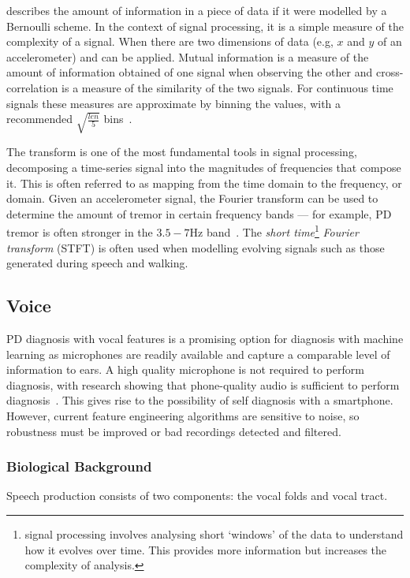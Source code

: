 \documentclass[12pt, twoside]{book}
\renewcommand\emph[1]{\textit{\color{USred}{#1}}}
\begin{document}
\emph{Entropy} describes the amount of information in a piece of data if it were modelled by a Bernoulli scheme. In the context of signal processing, it is a simple measure of the complexity of a signal. When there are two dimensions of data (e.g, $x$ and $y$ of an accelerometer) \emph{mutual information} and \emph{cross correlation} can be applied. Mutual information is a measure of the amount of information obtained of one signal when observing the other and cross-correlation is a measure of the similarity of the two signals. For continuous time signals these measures are approximate by binning the values, with a recommended $\sqrt{\frac{len}{5}}$ bins~\cite{entropymeasures}.

The \emph{Fourier} transform is one of the most fundamental tools in signal processing, decomposing a time-series signal into the magnitudes of frequencies that compose it. This is often referred to as mapping from the time domain to the frequency, or \emph{spectral} domain. Given an accelerometer signal, the Fourier transform can be used to determine the amount of tremor in certain frequency bands --- for example, PD tremor is often stronger in the $3.5-7$Hz band~\cite{duval2004detection}. The \textit{short time}\footnote{\emph{Short time} signal processing involves analysing short `windows' of the data to understand how it evolves over time. This provides more information but increases the complexity of analysis.} \textit{Fourier transform} (STFT) is often used when modelling evolving signals such as those generated during speech and walking. 




\subsection{Voice}
PD diagnosis with vocal features is a promising option for diagnosis with machine learning as microphones are readily available and capture a comparable level of information to ears. A high quality microphone is not required to perform diagnosis, with research showing that phone-quality audio is sufficient to perform diagnosis~\cite{splittledysphonia2009}. This gives rise to the possibility of self diagnosis with a smartphone. However, current feature engineering algorithms are sensitive to noise, so robustness must be improved or bad recordings detected and filtered.


\subsubsection{Biological Background}
\label{speechbio}
Speech production consists of two components: the vocal folds and vocal tract. 
\end{document}
